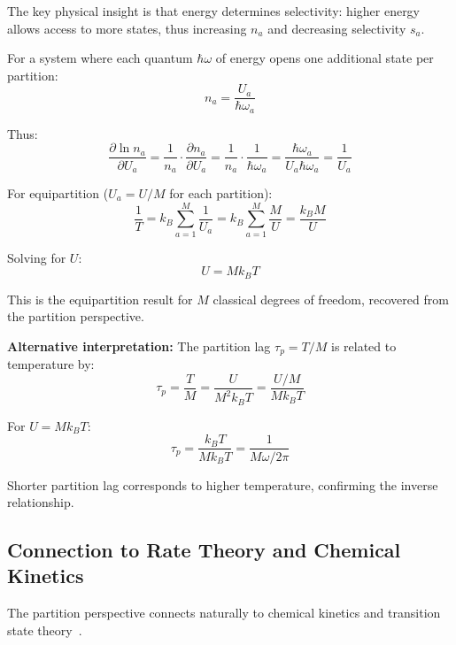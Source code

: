 The key physical insight is that energy determines selectivity: higher energy allows access to more states, thus increasing $n_a$ and decreasing selectivity $s_a$.

For a system where each quantum $\hbar\omega$ of energy opens one additional state per partition:
\begin{equation}
n_a = \frac{U_a}{\hbar\omega_a}
\end{equation}

Thus:
\begin{equation}
\frac{\partial \ln n_a}{\partial U_a} = \frac{1}{n_a} \cdot \frac{\partial n_a}{\partial U_a} = \frac{1}{n_a} \cdot \frac{1}{\hbar\omega_a} = \frac{\hbar\omega_a}{U_a \hbar\omega_a} = \frac{1}{U_a}
\end{equation}

For equipartition ($U_a = U/M$ for each partition):
\begin{equation}
\frac{1}{T} = k_B \sum_{a=1}^{M} \frac{1}{U_a} = k_B \sum_{a=1}^{M} \frac{M}{U} = \frac{k_B M}{U}
\end{equation}

Solving for $U$:
\begin{equation}
\boxed{U = M k_B T}
\label{eq:partition_internal_energy}
\end{equation}

This is the equipartition result for $M$ classical degrees of freedom, recovered from the partition perspective.

\textbf{Alternative interpretation:} The partition lag $\tau_p = T/M$ is related to temperature by:
\begin{equation}
\tau_p = \frac{T}{M} = \frac{U}{M^2 k_B T} = \frac{U/M}{M k_B T}
\end{equation}

For $U = Mk_BT$:
\begin{equation}
\tau_p = \frac{k_B T}{M k_B T} = \frac{1}{M\omega/2\pi}
\end{equation}

Shorter partition lag corresponds to higher temperature, confirming the inverse relationship.

\subsection{Connection to Rate Theory and Chemical Kinetics}

The partition perspective connects naturally to chemical kinetics and transition state theory~\cite{eyring1935}.

